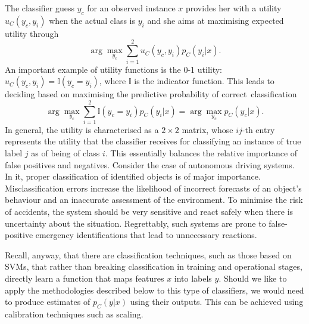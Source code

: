  The classifier guess $y_c$ for an observed instance $x$ provides her with a utility $u_C (y_c, y_i)$ when the
 actual class is $y_i$ and she aims at maximising expected utility
 through  
\begin{equation}\label{amarinha}
 \arg\max_{y_c} \sum_{i=1}^2
u_C (y_c , y_i ) p _C (y_i | x ).
\end{equation}
An important example of utility functions is the 0-1 utility: $u_C (y_c, y_i) = \mathbb{I}(y_c = y_i)$, where $\mathbb{I}$ is the indicator function. This leads to deciding based on maximising the
 predictive probability of correct~classification
\begin{equation}\label{seen}
\arg\max_{y_c} \sum_{i=1}^2 \mathbb{I}(y_c = y_i) p_C(y_i|x) = \arg\max_{y_c} p_C(y_c|x).
\end{equation}
%
In general, the 
utility is characterised as
a $2 \times 2$ matrix, whose $ij$-th entry 
represents the utility that the classifier
receives for classifying an instance of true label $j$ as of being of class $i$. This essentially balances the relative importance of false positives and negatives. Consider the case of autonomous driving systems. 
In it, proper classification of identified objects is of
major 
importance. Misclassification errors increase the 
likelihood of incorrect forecasts of an object’s behaviour and an inaccurate assessment of the environment. To minimise the risk of accidents, the system should be very sensitive and react safely when there is uncertainty about the situation. Regrettably, such systems are prone to false-positive emergency identifications that lead to unnecessary reactions. %



Recall, anyway, that there are classification techniques, such as those based on SVMs, that rather than breaking classification in training and operational stages, directly learn a function that maps features $x$ into labels $y$. Should we like to apply the methodologies described below to this type of classifiers, we would need to produce estimates of $p_C(y|x)$ using their outputs. This can be achieved using calibration techniques such as 
\cite{platt1999probabilistic} scaling.

